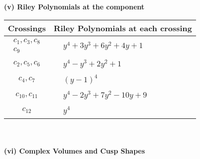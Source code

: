 \documentclass[1p]{elsarticle_modified}
\theoremstyle{definition}
\begin{document}
\newpage\renewcommand{\arraystretch}{1}
\flushleft \textbf{(v) Riley Polynomials at the component}\newline \\
\begin{tabular}{m{50pt}|m{274pt}}
Crossings & \hspace{64pt}Riley Polynomials at each crossing \\
\hline $$\begin{aligned}c_{1},c_{3},c_{8}\\c_{9}\end{aligned}$$&$\begin{aligned}
&y^4+3 y^3+6 y^2+4 y+1
\end{aligned}$\\
\hline $$\begin{aligned}c_{2},c_{5},c_{6}\end{aligned}$$&$\begin{aligned}
&y^4- y^3+2 y^2+1
\end{aligned}$\\
\hline $$\begin{aligned}c_{4},c_{7}\end{aligned}$$&$\begin{aligned}
&(y-1)^4
\end{aligned}$\\
\hline $$\begin{aligned}c_{10},c_{11}\end{aligned}$$&$\begin{aligned}
&y^4-2 y^3+7 y^2-10 y+9
\end{aligned}$\\
\hline $$\begin{aligned}c_{12}\end{aligned}$$&$\begin{aligned}
&y^4
\end{aligned}$\\
\hline
\end{tabular}\\~\\
\newpage\flushleft \textbf{(vi) Complex Volumes and Cusp Shapes}
\end{document}
